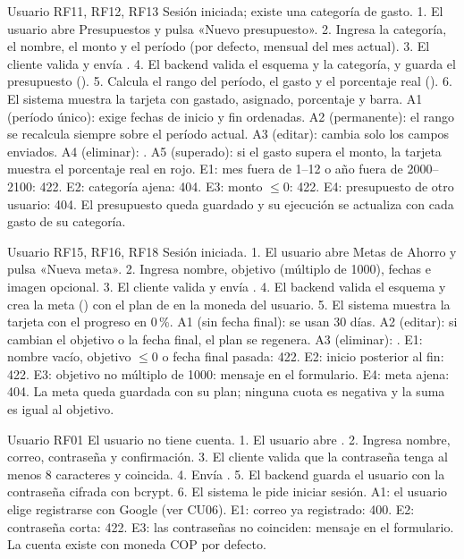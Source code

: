 {Usuario}
{RF11, RF12, RF13}
{Sesión iniciada; existe una categoría de gasto.}
{1. El usuario abre Presupuestos y pulsa «Nuevo presupuesto». 2. Ingresa la categoría, el nombre, el monto y el período (por defecto, mensual del mes actual). 3. El cliente valida y envía . 4. El backend valida el esquema y la categoría, y guarda el presupuesto (). 5. Calcula el rango del período, el gasto y el porcentaje real (). 6. El sistema muestra la tarjeta con gastado, asignado, porcentaje y barra.}
{A1 (período único): exige fechas de inicio y fin ordenadas. A2 (permanente): el rango se recalcula siempre sobre el período actual. A3 (editar):  cambia solo los campos enviados. A4 (eliminar): . A5 (superado): si el gasto supera el monto, la tarjeta muestra el porcentaje real en rojo.}
{E1: mes fuera de 1–12 o año fuera de 2000–2100: 422. E2: categoría ajena: 404. E3: monto $\leq 0$: 422. E4: presupuesto de otro usuario: 404.}
{El presupuesto queda guardado y su ejecución se actualiza con cada gasto de su categoría.}

{Usuario}
{RF15, RF16, RF18}
{Sesión iniciada.}
{1. El usuario abre Metas de Ahorro y pulsa «Nueva meta». 2. Ingresa nombre, objetivo (múltiplo de 1000), fechas e imagen opcional. 3. El cliente valida y envía . 4. El backend valida el esquema y crea la meta () con el plan de  en la moneda del usuario. 5. El sistema muestra la tarjeta con el progreso en 0\,\%.}
{A1 (sin fecha final): se usan 30 días. A2 (editar): si cambian el objetivo o la fecha final, el plan se regenera. A3 (eliminar): .}
{E1: nombre vacío, objetivo $\leq 0$ o fecha final pasada: 422. E2: inicio posterior al fin: 422. E3: objetivo no múltiplo de 1000: mensaje en el formulario. E4: meta ajena: 404.}
{La meta queda guardada con su plan; ninguna cuota es negativa y la suma es igual al objetivo.}

{Usuario}
{RF01}
{El usuario no tiene cuenta.}
{1. El usuario abre . 2. Ingresa nombre, correo, contraseña y confirmación. 3. El cliente valida que la contraseña tenga al menos 8 caracteres y coincida. 4. Envía . 5. El backend guarda el usuario con la contraseña cifrada con bcrypt. 6. El sistema le pide iniciar sesión.}
{A1: el usuario elige registrarse con Google (ver CU06).}
{E1: correo ya registrado: 400. E2: contraseña corta: 422. E3: las contraseñas no coinciden: mensaje en el formulario.}
{La cuenta existe con moneda COP por defecto.}

